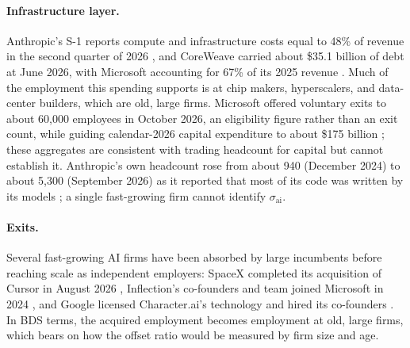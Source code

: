 \paragraph{Infrastructure layer.}
Anthropic's S-1 reports compute and infrastructure costs equal to 48\% of revenue in the second quarter of 2026 \citep{anthropic2026s1}, and CoreWeave carried about \$35.1 billion of debt at June 2026, with Microsoft accounting for 67\% of its 2025 revenue \citep{coreweave2026tenk,coreweave2026tenq}.
Much of the employment this spending supports is at chip makers, hyperscalers, and data-center builders, which are old, large firms.
Microsoft offered voluntary exits to about 60,000 employees in October 2026, an eligibility figure rather than an exit count, while guiding calendar-2026 capital expenditure to about \$175 billion \citep{techcrunch2026msftbuyout,msft2026fy26q4}; these aggregates are consistent with trading headcount for capital but cannot establish it.
Anthropic's own headcount rose from about 940 (December 2024) to about 5,300 (September 2026) as it reported that most of its code was written by its models \citep{anthropic2026s1}; a single fast-growing firm cannot identify $\sigma_{\text{ai}}$.

\paragraph{Exits.}
Several fast-growing AI firms have been absorbed by large incumbents before reaching scale as independent employers: SpaceX completed its acquisition of Cursor in August 2026 \citep{spacex2026cursoragreement,spacex2026cursorclose}, Inflection's co-founders and team joined Microsoft in 2024 \citep{microsoft2024inflection}, and Google licensed Character.ai's technology and hired its co-founders \citep{mehta2024characterai}.
In BDS terms, the acquired employment becomes employment at old, large firms, which bears on how the offset ratio would be measured by firm size and age.
